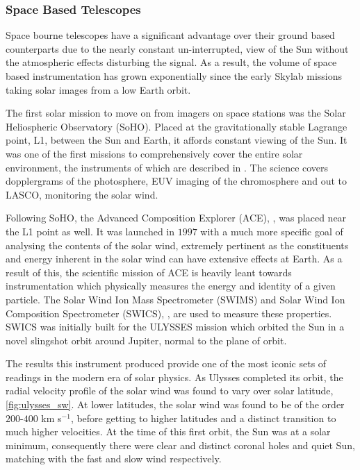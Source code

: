 \subsubsection{Space Based Telescopes}

Space bourne telescopes have a significant advantage over their ground based counterparts due to the nearly constant un-interrupted, view of the Sun without the atmospheric effects disturbing the signal.
As a result, the volume of space based instrumentation has grown exponentially since the early Skylab missions taking solar images from a low Earth orbit.

The first solar mission to move on from imagers on space stations was the Solar Heliospheric Observatory (SoHO).
Placed at the gravitationally stable Lagrange point, L1, between the Sun and Earth, it affords constant viewing of the Sun.
It was one of the first missions to comprehensively cover the entire solar environment, the instruments of which are described in \cite{StCyr1995}.
The science covers dopplergrams of the photosphere, EUV imaging of the chromosphere and out to LASCO, monitoring the solar wind.

Following SoHO, the Advanced Composition Explorer (ACE), \cite{Garrard1997}, was placed near the L1 point as well.
It was launched in $1997$ with a much more specific goal of analysing the contents of the solar wind, extremely pertinent as the constituents and energy inherent in the solar wind can have extensive effects at Earth.
As a result of this, the scientific mission of ACE is heavily leant towards instrumentation which physically measures the energy and identity of a given particle.
The Solar Wind Ion Mass Spectrometer (SWIMS) and Solar Wind Ion Composition Spectrometer (SWICS), \cite{Gloeckler1992}, are used to measure these properties.
SWICS was initially built for the ULYSSES \cite{Ulysses1992} mission which orbited the Sun in a novel slingshot orbit around Jupiter, normal to the plane of orbit.

The results this instrument produced provide one of the most iconic sets of readings in the modern era of solar physics.
As Ulysses completed its orbit, the radial velocity profile of the solar wind was found to vary over solar latitude, \cref{fig:ulysses_sw}.
At lower latitudes, the solar wind was found to be of the order $200$-$400$ km s$^{-1}$, before getting to higher latitudes and a distinct transition to much higher velocities.
At the time of this first orbit, the Sun was at a solar minimum, consequently there were clear and distinct coronal holes and quiet Sun, matching with the fast and slow wind respectively.


